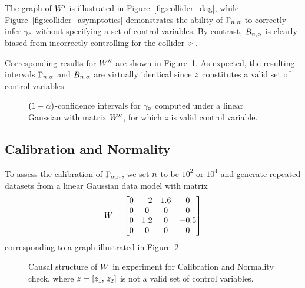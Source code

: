 The graph of $W '$ is illustrated in Figure~\ref{fig:collider_dag}, while Figure~\ref{fig:collider_asymptotics} demonstrates the ability of $\Gamma_{n,\alpha}$ to correctly infer $\gamma_\circ$ without specifying a set of control variables. By contrast, $B_{n,\alpha}$ is clearly biased from incorrectly controlling for the collider $z_1$.

Corresponding results for $W ''$ are shown in Figure~\ref{fig:fork_asymptotics}. As expected, the resulting intervals $\Gamma_{n,\alpha}$ and $B_{n,\alpha}$ are virtually identical since $z$ constitutes a valid set of control variables.
\begin{figure}[htbp]
     \centering
     
     \caption{$(1-\alpha)$-confidence intervals for $\gamma_\circ$ computed under a linear Gaussian \scm{} with matrix $W ''$, for which $z$ is valid control variable.}
     \label{fig:fork_asymptotics}
\end{figure}



\subsection{Calibration and Normality}\label{subsection:calibration}
To assess the calibration of $\Gamma_{\alpha,n}$, we set $n$ to be $10^2$ or $10^4$ and generate repeated datasets from a linear Gaussian data model with matrix \[W=\begin{bmatrix}
          0 & -2  & 1.6 & 0    \\
          0 & 0   & 0   & 0    \\
          0 & 1.2 & 0   & -0.5 \\
          0 & 0   & 0   & 0    \\
     \end{bmatrix}\]
corresponding to a graph illustrated in Figure~\ref{fig:calibration_dag}.
\begin{figure}
     \centering
     
     \caption{Causal structure of $W$ in experiment for Calibration and Normality check, where $z=[z_1,\,z_2]$ is  not a valid set of control variables.}
     \label{fig:calibration_dag}
\end{figure}

